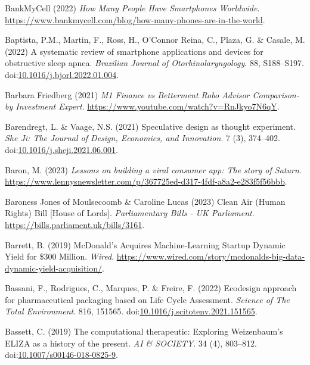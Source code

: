 \documentclass[
  letterpaper,
  DIV=11,
  numbers=noendperiod]{scrartcl}
\newlength{\cslhangindent}
\newenvironment{CSLReferences}[2] %
 {\begin{list}{}{%
  \setlength{\itemindent}{0pt}
  \setlength{\leftmargin}{0pt}
  \setlength{\parsep}{0pt}
  \ifodd #1
   \setlength{\leftmargin}{\cslhangindent}
   \setlength{\itemindent}{-1\cslhangindent}
  \fi
  \setlength{\itemsep}{#2\baselineskip}}}
 {\end{list}}
\begin{document}
\begin{CSLReferences}{0}{1}
BankMyCell (2022) \emph{How {Many People Have Smartphones Worldwide}}.
\url{https://www.bankmycell.com/blog/how-many-phones-are-in-the-world}.

Baptista, P.M., Martin, F., Ross, H., O'Connor Reina, C., Plaza, G. \&
Casale, M. (2022) A systematic review of smartphone applications and
devices for obstructive sleep apnea. \emph{Brazilian Journal of
Otorhinolaryngology}. 88, S188--S197.
doi:\href{https://doi.org/10.1016/j.bjorl.2022.01.004}{10.1016/j.bjorl.2022.01.004}.

Barbara Friedberg (2021) \emph{M1 {Finance} vs {Betterment Robo Advisor
Comparison-by Investment Expert}}.
\url{https://www.youtube.com/watch?v=RnJkyo7N6qY}.

Barendregt, L. \& Vaage, N.S. (2021) Speculative design as thought
experiment. \emph{She Ji: The Journal of Design, Economics, and
Innovation}. 7 (3), 374--402.
doi:\href{https://doi.org/10.1016/j.sheji.2021.06.001}{10.1016/j.sheji.2021.06.001}.

Baron, M. (2023) \emph{Lessons on building a viral consumer app: {The}
story of {Saturn}}.
\url{https://www.lennysnewsletter.com/p/367725ed-d317-4fdf-a8a2-e283f5f56bbb}.

Baroness Jones of Moulsecoomb \& Caroline Lucas (2023) Clean {Air}
({Human Rights}) {Bill} {[}{House} of {Lords}{]}. \emph{Parliamentary
Bills - UK Parliament}. \url{https://bills.parliament.uk/bills/3161}.

Barrett, B. (2019) {McDonald}'s {Acquires Machine-Learning Startup
Dynamic Yield} for \$300 {Million}. \emph{Wired}.
\url{https://www.wired.com/story/mcdonalds-big-data-dynamic-yield-acquisition/}.

Bassani, F., Rodrigues, C., Marques, P. \& Freire, F. (2022) Ecodesign
approach for pharmaceutical packaging based on {Life Cycle Assessment}.
\emph{Science of The Total Environment}. 816, 151565.
doi:\href{https://doi.org/10.1016/j.scitotenv.2021.151565}{10.1016/j.scitotenv.2021.151565}.

Bassett, C. (2019) The computational therapeutic: Exploring
{Weizenbaum}'s {ELIZA} as a history of the present. \emph{AI \&
SOCIETY}. 34 (4), 803--812.
doi:\href{https://doi.org/10.1007/s00146-018-0825-9}{10.1007/s00146-018-0825-9}.


\end{CSLReferences}
\end{document}
